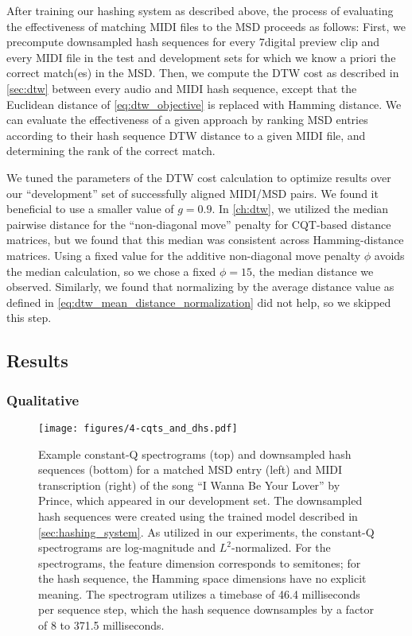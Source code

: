 After training our hashing system as described above, the process of evaluating the effectiveness of matching MIDI files to the MSD proceeds as follows:
First, we precompute downsampled hash sequences for every 7digital preview clip and every MIDI file in the test and development sets for which we know a priori the correct match(es) in the MSD.
Then, we compute the DTW cost as described in \cref{sec:dtw} between every audio and MIDI hash sequence, except that the Euclidean distance of \cref{eq:dtw_objective} is replaced with Hamming distance.
We can evaluate the effectiveness of a given approach by ranking MSD entries according to their hash sequence DTW distance to a given MIDI file, and determining the rank of the correct match.

We tuned the parameters of the DTW cost calculation to optimize results over our ``development'' set of successfully aligned MIDI/MSD pairs.
We found it beneficial to use a smaller value of $g = 0.9$.
In \cref{ch:dtw}, we utilized the median pairwise distance for the ``non-diagonal move'' penalty for CQT-based distance matrices, but we found that this median was consistent across Hamming-distance matrices.
Using a fixed value for the additive non-diagonal move penalty $\phi$ avoids the median calculation, so we chose a fixed $\phi = 15$, the median distance we observed.
Similarly, we found that normalizing by the average distance value as defined in \cref{eq:dtw_mean_distance_normalization} did not help, so we skipped this step.

\subsection{Results}

\subsubsection{Qualitative}

\begin{figure}
  \texttt{[image: figures/4-cqts\_and\_dhs.pdf]}
  \caption[Spectrograms and downsampled hash sequences for a matching pair]{Example constant-Q spectrograms (top) and downsampled hash sequences (bottom) for a matched MSD entry (left) and MIDI transcription (right) of the song ``I Wanna Be Your Lover'' by Prince, which appeared in our development set.
The downsampled hash sequences were created using the trained model described in \cref{sec:hashing_system}.
As utilized in our experiments, the constant-Q spectrograms are log-magnitude and $L^2$-normalized.
For the spectrograms, the feature dimension corresponds to semitones; for the hash sequence, the Hamming space dimensions have no explicit meaning.
The spectrogram utilizes a timebase of 46.4 milliseconds per sequence step, which the hash sequence downsamples by a factor of 8 to 371.5 milliseconds.}
  \label{fig:cqts_and_dhs}
\end{figure}

